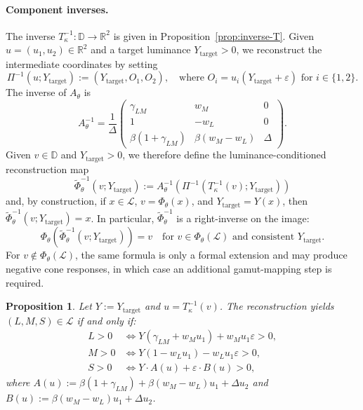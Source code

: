 \documentclass[11pt]{article}
\theoremstyle{plain}
\newtheorem{proposition}[theorem]{Proposition}
\theoremstyle{definition}
\theoremstyle{remark}
\newcommand{\R}{\mathbb{R}}
\newcommand{\D}{\mathbb{D}}
\begin{document}
\paragraph{Component inverses.} The inverse $T_\kappa^{-1}: \D \to \R^2$ is given in Proposition~\ref{prop:inverse-T}.
Given $u = (u_1, u_2) \in \R^2$ and a target luminance $Y_{\mathrm{target}} > 0$, we reconstruct the intermediate coordinates by setting
\begin{equation}
\Pi^{-1}(u; Y_{\mathrm{target}}) := (Y_{\mathrm{target}}, O_1, O_2), \quad \text{where } O_i = u_i(Y_{\mathrm{target}} + \varepsilon) \text{ for } i \in \{1, 2\}.
\end{equation}
The inverse of $A_\theta$ is
\begin{equation}
A_\theta^{-1} = \frac{1}{\Delta} \begin{pmatrix}
\gamma_{LM} & w_M & 0 \\
1 & -w_L & 0 \\
\beta(1 + \gamma_{LM}) & \beta(w_M - w_L) & \Delta
\end{pmatrix}.
\end{equation}
Given $v \in \D$ and $Y_{\mathrm{target}} > 0$, we therefore define the luminance-conditioned reconstruction map
\begin{equation}
\boxed{
\widetilde{\Phi}_\theta^{-1}(v; Y_{\mathrm{target}}) := A_\theta^{-1} \left( \Pi^{-1}(T_\kappa^{-1}(v); Y_{\mathrm{target}}) \right)
}
\end{equation}
and, by construction, if $x \in \mathcal{L}$, $v = \Phi_\theta(x)$, and $Y_{\mathrm{target}} = Y(x)$, then $\widetilde{\Phi}_\theta^{-1}(v; Y_{\mathrm{target}}) = x$. In particular, $\widetilde{\Phi}_\theta^{-1}$ is a right-inverse on the image:
\begin{equation}
\Phi_\theta(\widetilde{\Phi}_\theta^{-1}(v; Y_{\mathrm{target}})) = v \quad \text{for } v \in \Phi_\theta(\mathcal{L}) \text{ and consistent } Y_{\mathrm{target}}.
\end{equation}
For $v \notin \Phi_\theta(\mathcal{L})$, the same formula is only a formal extension and may produce negative cone responses, in which case an additional gamut-mapping step is required.

\begin{proposition}
\label{prop:positivity}
Let $Y := Y_{\mathrm{target}}$ and $u = T_\kappa^{-1}(v)$. The reconstruction yields $(L, M, S) \in \mathcal{L}$ if and only if:
\begin{align}
L > 0 &\iff Y(\gamma_{LM} + w_M u_1) + w_M u_1 \varepsilon > 0, \label{eq:L-pos}\\
M > 0 &\iff Y(1 - w_L u_1) - w_L u_1 \varepsilon > 0, \label{eq:M-pos}\\
S > 0 &\iff Y \cdot A(u) + \varepsilon \cdot B(u) > 0, \label{eq:S-pos}
\end{align}
where $A(u) := \beta(1+\gamma_{LM}) + \beta(w_M - w_L)u_1 + \Delta u_2$ and $B(u) := \beta(w_M - w_L)u_1 + \Delta u_2$.
\end{proposition}
\end{document}
